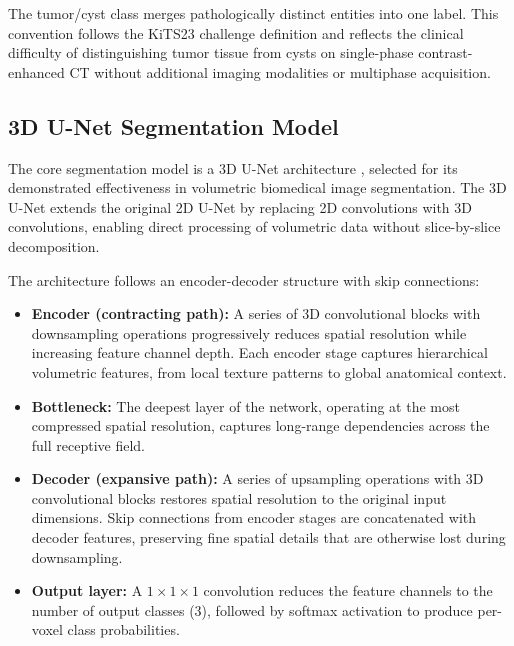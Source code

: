 The tumor/cyst class merges pathologically distinct entities into one label. This convention follows the KiTS23 challenge definition and reflects the clinical difficulty of distinguishing tumor tissue from cysts on single-phase contrast-enhanced CT without additional imaging modalities or multiphase acquisition.

\subsection{3D U-Net Segmentation Model}

The core segmentation model is a 3D U-Net architecture \cite{unet3d}, selected for its demonstrated effectiveness in volumetric biomedical image segmentation. The 3D U-Net extends the original 2D U-Net \cite{unet} by replacing 2D convolutions with 3D convolutions, enabling direct processing of volumetric data without slice-by-slice decomposition.

The architecture follows an encoder-decoder structure with skip connections:

\begin{itemize}
    \item \textbf{Encoder (contracting path):} A series of 3D convolutional blocks with downsampling operations progressively reduces spatial resolution while increasing feature channel depth. Each encoder stage captures hierarchical volumetric features, from local texture patterns to global anatomical context.
    \item \textbf{Bottleneck:} The deepest layer of the network, operating at the most compressed spatial resolution, captures long-range dependencies across the full receptive field.
    \item \textbf{Decoder (expansive path):} A series of upsampling operations with 3D convolutional blocks restores spatial resolution to the original input dimensions. Skip connections from encoder stages are concatenated with decoder features, preserving fine spatial details that are otherwise lost during downsampling.
    \item \textbf{Output layer:} A $1 \times 1 \times 1$ convolution reduces the feature channels to the number of output classes (3), followed by softmax activation to produce per-voxel class probabilities.
\end{itemize}


